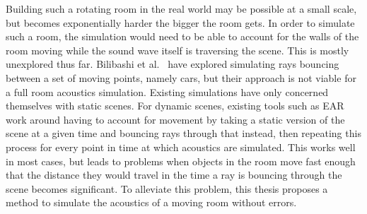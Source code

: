 Building such a rotating room in the real world may be possible at a small scale,
but becomes exponentially harder the bigger the room gets.
\newline
In order to simulate such a room, the simulation would need to be able to account for
the walls of the room moving while the sound wave itself is traversing the scene.
This is mostly unexplored thus far.
Bilibashi et al.~\cite{BVD20} have explored simulating rays bouncing between a set of moving points, namely cars,
but their approach is not viable for a full room acoustics simulation.
\newline
Existing simulations have only concerned themselves with static scenes.
For dynamic scenes, existing tools such as EAR work around having to account for movement by
taking a static version of the scene at a given time and bouncing rays through that instead,
then repeating this process for every point in time at which acoustics are simulated.
\newline
This works well in most cases, but leads to problems when objects in the room move fast enough
that the distance they would travel in the time a ray is bouncing through the scene becomes significant.
To alleviate this problem, this thesis proposes a method to simulate the acoustics of a moving room without errors.

